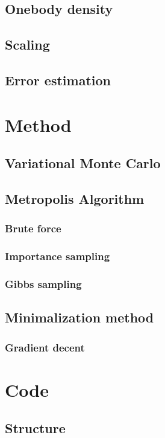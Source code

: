 \documentclass[norsk,a4paper,12pt]{article}
\begin{document}
\subsection{Onebody density}

\subsection{Scaling}

\subsection{Error estimation}

\section{Method}

\subsection{Variational Monte Carlo}
\subsection{Metropolis Algorithm}
\subsubsection{Brute force}
\subsubsection{Importance sampling}
\subsubsection{Gibbs sampling}

\subsection{Minimalization method}
\subsubsection{Gradient decent}

\section{Code}
\subsection{Structure}
\end{document}

